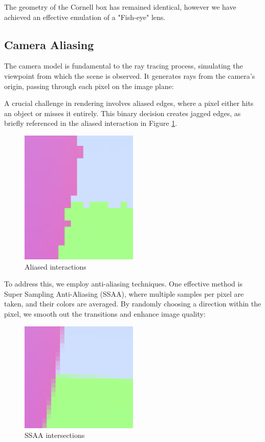 \documentclass[12pt]{article}
\begin{document}
The geometry of the Cornell box has remained identical, however we have achieved an effective emulation of a "Fish-eye" lens.

\subsection{Camera Aliasing}
The camera model is fundamental to the ray tracing process, simulating the viewpoint from which the scene is observed. It generates rays from the camera's origin, passing through each pixel on the image plane:

A crucial challenge in rendering involves aliased edges, where a pixel either hits an object or misses it entirely. This binary decision creates jagged edges, as briefly referenced in the aliased interaction in Figure \ref{fig:aliasedintersection}.

\begin{figure}[H]
    \centering
    \includegraphics[width=0.5\textwidth]{images/aliasing/no-aliasing.png}
    \caption{Aliased interactions}
    \label{fig:aliasedintersection}
\end{figure}

To address this, we employ anti-aliasing techniques. One effective method is Super Sampling Anti-Aliasing (SSAA), where multiple samples per pixel are taken, and their colors are averaged. By randomly choosing a direction within the pixel, we smooth out the transitions and enhance image quality:

\begin{figure}[H]
    \centering
    \includegraphics[width=0.5\textwidth]{images/aliasing/aliased.png}
    \caption{SSAA intersections}
    \label{fig:antialiasedintersection}
\end{figure}
\end{document}

